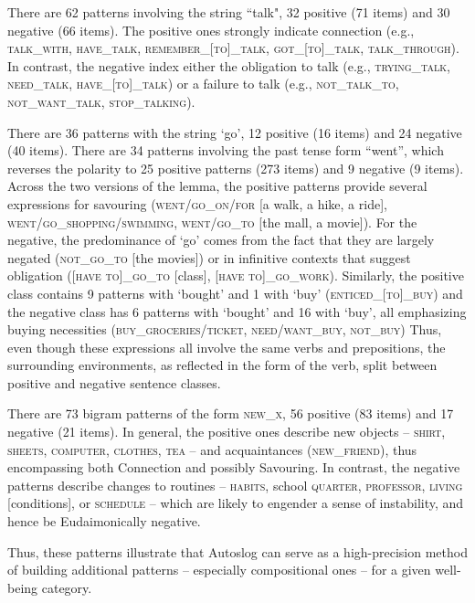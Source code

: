 \documentclass[11pt,letterpaper]{article}
\begin{document}
There are 62 patterns involving the string ``talk", 32 positive (71
items) and 30 negative (66 items).  The positive ones strongly
indicate connection (e.g., \textsc{talk\_with}, \textsc{have\_talk},
\textsc{remember\_[to]\_talk}, \textsc{got\_[to]\_talk}, \textsc{talk\_through}).
In contrast, the negative index either
the obligation to talk (e.g., \textsc{trying\_talk}, \textsc{need\_talk}, \textsc{have\_[to]\_talk})
or a failure to talk (e.g., \textsc{not\_talk\_to}, \textsc{not\_want\_talk}, \textsc{stop\_talking}).

There are 36 patterns with the string `go', 12 positive (16 items) and
24 negative (40 items).  There are 34 patterns involving the past
tense form ``went'', which reverses the polarity to 25 positive
patterns (273 items) and 9 negative (9 items).  Across the two
versions of the lemma, the positive patterns provide several
expressions for savouring (\textsc{went/go\_on/for} [a walk, a hike, a ride],
\textsc{went/go\_shopping/swimming}, \textsc{went/go\_to} [the mall, a movie]).  For the
negative, the predominance of `go' comes from the fact that they are
largely negated (\textsc{not\_go\_to} [the movies]) or in infinitive contexts
that suggest obligation (\textsc{[have to]\_go\_to} [class], \textsc{[have to]\_go\_work}).
Similarly, the positive class contains 9 patterns with
`bought' and 1 with `buy' (\textsc{enticed\_[to]\_buy}) and the negative
class has 6 patterns with `bought' and 16 with `buy', all emphasizing
buying necessities (\textsc{buy\_groceries/ticket}, \textsc{need/want\_buy}, \textsc{not\_buy})
Thus, even though these expressions all involve the same verbs and
prepositions, the surrounding environments, as reflected in the form
of the verb, split between positive and negative sentence classes.

There are 73 bigram patterns of the form \textsc{new\_x}, 56 positive (83 items) and 17
negative (21 items).  In general, the positive ones describe new
objects -- \textsc{shirt}, \textsc{sheets}, \textsc{computer}, \textsc{clothes}, \textsc{tea} -- and
acquaintances (\textsc{new\_friend}), thus encompassing both Connection and
possibly Savouring.  In contrast, the negative patterns describe
changes to routines -- \textsc{habits}, school \textsc{quarter}, \textsc{professor},
\textsc{living} [conditions], or \textsc{schedule} -- which are likely to engender a
sense of instability, and hence be Eudaimonically negative.

Thus, these patterns illustrate that Autoslog can serve as a high-precision
method of building additional patterns -- especially compositional ones -- 
for a given well-being category.
\end{document}
